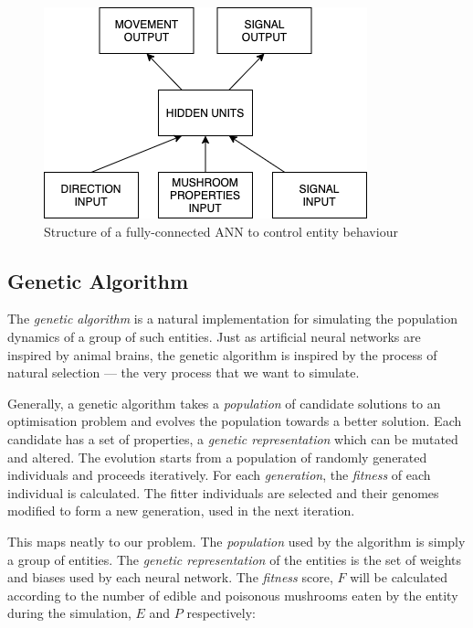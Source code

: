 \documentclass[12pt,a4paper,twoside,openright]{report}
\begin{document}
\begin{figure}[t]
  \centering
  \includegraphics[width=.6\linewidth]{figs/NeuralNets}
  \caption{Structure of a fully-connected ANN to control entity behaviour}
  \label{fig:neuralnet}
\end{figure}





\subsection{Genetic Algorithm}\label{section:genetic}

The \emph{genetic algorithm} is a natural implementation for simulating the population dynamics of a group of such entities. Just as artificial neural networks are inspired by animal brains, the genetic algorithm is inspired by the process of natural selection --- the very process that we want to simulate. 

Generally, a genetic algorithm takes a \emph{population} of candidate solutions to an optimisation problem and evolves the population towards a better solution. Each candidate has a set of properties, a \emph{genetic representation} which can be mutated and altered. The evolution starts from a population of randomly generated individuals and proceeds iteratively. For each \emph{generation}, the \emph{fitness} of each individual is calculated. The fitter individuals are selected and their genomes modified to form a new generation, used in the next iteration.

This maps neatly to our problem. The \emph{population} used by the algorithm is simply a group of entities. The \emph{genetic representation} of the entities is the set of weights and biases used by each neural network. The \emph{fitness} score, $F$ will be calculated according to the number of edible and poisonous mushrooms eaten by the entity during the simulation, $E$ and $P$ respectively:
\end{document}
